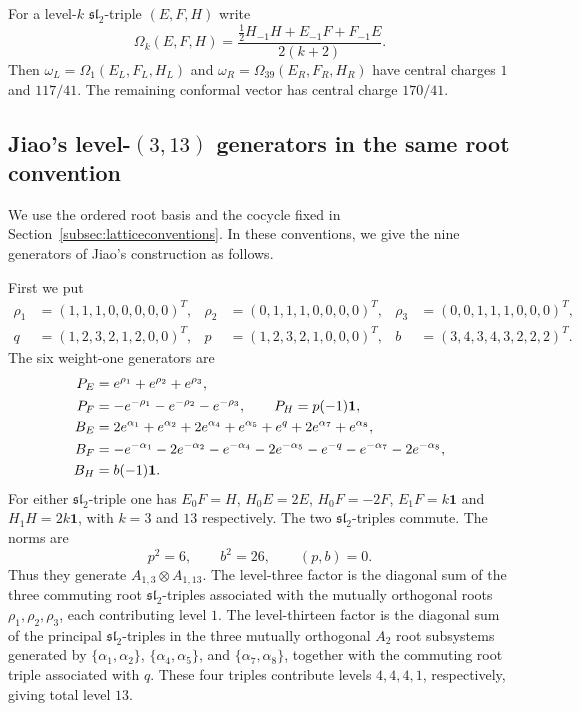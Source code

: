 \documentclass[11pt,reqno]{amsart}
\theoremstyle{definition}\newtheorem{definition}[theorem]{Definition}
\theoremstyle{remark}\newtheorem{remark}[theorem]{Remark}
\newcommand{\one}{\mathbf1}\newcommand{\slc}{\mathfrak{sl}_2}
\numberwithin{equation}{section}
\begin{document}
For a level-$k$ $\slc$-triple $(E,F,H)$ write
\begin{equation}\label{eq:sug}
 \Omega_k(E,F,H)=\frac{\frac12H_{-1}H+E_{-1}F+F_{-1}E}{2(k+2)}.
\end{equation}
Then $\omega_L=\Omega_1(E_L,F_L,H_L)$ and
$\omega_R=\Omega_{39}(E_R,F_R,H_R)$ have central charges $1$ and $117/41$. The remaining conformal vector has central charge $170/41$.

\subsection{Jiao's level-\texorpdfstring{$(3,13)$}{(3,13)} generators in the same root convention}
We use the ordered root basis and the cocycle fixed in Section~\ref{subsec:latticeconventions}. In these conventions, we give the nine generators of Jiao's construction \cite{Jiao} as follows. 

First we put
\begin{align*}
 \rho_1&=(1,1,1,0,0,0,0,0)^T,&
 \rho_2&=(0,1,1,1,0,0,0,0)^T,&
 \rho_3&=(0,0,1,1,1,0,0,0)^T,\\
 q&=(1,2,3,2,1,2,0,0)^T,&
 p&=(1,2,3,2,1,0,0,0)^T,&
 b&=(3,4,3,4,3,2,2,2)^T.
\end{align*}
The six weight-one generators are
\begin{align}
 P_E&=e^{\rho_1}+e^{\rho_2}+e^{\rho_3},\notag\\
 P_F&=-e^{-\rho_1}-e^{-\rho_2}-e^{-\rho_3},\qquad P_H=p(-1)\one,
 \label{eq:P}\\
 B_E&=2e^{\alpha_1}+e^{\alpha_2}+2e^{\alpha_4}+e^{\alpha_5}
       +e^q+2e^{\alpha_7}+e^{\alpha_8},\label{eq:BE}\\
 B_F&=-e^{-\alpha_1}-2e^{-\alpha_2}-e^{-\alpha_4}-2e^{-\alpha_5}
       -e^{-q}-e^{-\alpha_7}-2e^{-\alpha_8},\label{eq:BF}\\
 B_H&=b(-1)\one.\label{eq:BH}
\end{align}
For either $\slc$-triple one has $E_{0}F=H$, $H_{0}E=2E$, $H_{0}F=-2F$, $E_{1}F=k\one$ and $H_{1}H=2k\one$, with $k=3$ and $13$ respectively. The two $\slc$-triples commute. The norms are
\begin{equation}\label{eq:pb}
 p^2=6,\qquad b^2=26,\qquad (p,b)=0.
\end{equation}
Thus they generate $A_{1,3}\otimes A_{1,13}$. The level-three factor is the diagonal sum of the three commuting root
$\slc$-triples associated with the mutually orthogonal roots $\rho_1,\rho_2,\rho_3$, each contributing level $1$. The level-thirteen factor is the diagonal sum of the principal
$\mathfrak{sl}_2$-triples in the three mutually orthogonal $A_2$ root
subsystems generated by $\{\alpha_1,\alpha_2\}$,
$\{\alpha_4,\alpha_5\}$, and $\{\alpha_7,\alpha_8\}$, together with the commuting root triple associated with $q$. These four triples contribute levels $4,4,4,1$, respectively,
giving total level $13$.
\end{document}
